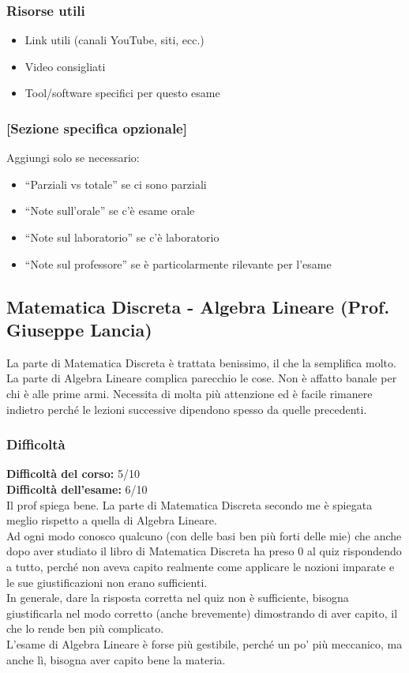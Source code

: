 \documentclass[18pt]{extarticle}
\begin{document}
\subsubsection{Risorse utili}
\begin{itemize}
\item Link utili (canali YouTube, siti, ecc.)
\item Video consigliati
\item Tool/software specifici per questo esame
\end{itemize}

\subsubsection{[Sezione specifica opzionale]}
Aggiungi solo se necessario:
\begin{itemize}
\item ``Parziali vs totale'' se ci sono parziali
\item ``Note sull'orale'' se c'è esame orale
\item ``Note sul laboratorio'' se c'è laboratorio
\item ``Note sul professore'' se è particolarmente rilevante per l'esame
\end{itemize}

\clearpage




\subsection{Matematica Discreta - Algebra Lineare (Prof. Giuseppe Lancia)}
La parte di Matematica Discreta è trattata benissimo, il che la semplifica molto.\\
La parte di Algebra Lineare complica parecchio le cose. Non è affatto banale per chi è alle prime armi. Necessita di molta più attenzione ed è facile rimanere indietro perché le lezioni successive dipendono spesso da quelle precedenti.\\

\subsubsection{Difficoltà}
\textbf{Difficoltà del corso:} 5/10\\
\textbf{Difficoltà dell'esame:} 6/10\\
Il prof spiega bene. La parte di Matematica Discreta secondo me è spiegata meglio rispetto a quella di Algebra Lineare.\\
Ad ogni modo conosco qualcuno (con delle basi ben più forti delle mie) che anche dopo aver studiato il libro di Matematica Discreta ha preso 0 al quiz rispondendo a tutto, perché non aveva capito realmente come applicare le nozioni imparate e le sue giustificazioni non erano sufficienti.\\
In generale, dare la risposta corretta nel quiz non è sufficiente, bisogna giustificarla nel modo corretto (anche brevemente) dimostrando di aver capito, il che lo rende ben più complicato.\\
L'esame di Algebra Lineare è forse più gestibile, perché un po' più meccanico, ma anche lì, bisogna aver capito bene la materia.\\
\end{document}
